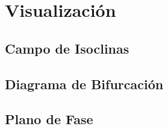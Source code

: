 \documentclass[a4paper,10pt,twocolumn]{article}
\begin{document}


\section{Visualización}\label{sec:visualizacion}


\subsection{Campo de Isoclinas}\label{subsec:isoclinas}



\subsection{Diagrama de Bifurcación}\label{subsec:bifurcacion}



\subsection{Plano de Fase}\label{subsec:plano-fase}
\end{document}
